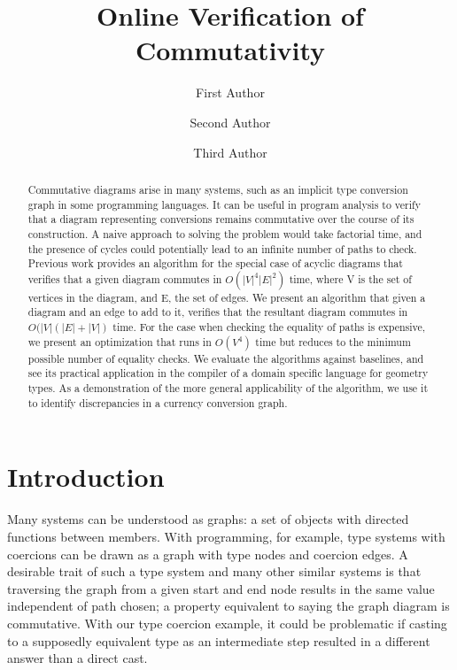 \documentclass[sigplan,review,anonymous]{acmart}
\begin{document}
\title{Online Verification of Commutativity}
%
%
\author{First Author}
\author{Second Author}
\authornotemark[1]

\author{Third Author}

\begin{abstract}
Commutative diagrams arise in many systems, such as an implicit type conversion graph in some programming languages.
It can be useful in program analysis to verify that a diagram representing conversions remains commutative over the course of its construction.
A naive approach to solving the problem would take factorial time, and the presence of cycles could potentially lead to an infinite number of paths to check. Previous work provides an algorithm for the special case of acyclic diagrams that verifies that a given diagram commutes in $O(|V|^4|E|^2)$ time, where V is the set of vertices in the diagram, and E, the set of edges. 
We present an algorithm that given a diagram and an edge to add to it, verifies that the resultant diagram commutes in $O(|V|(|E| + |V|)$ time. For the case when checking the equality of paths is expensive, we present an optimization that runs in $O(V^4)$ time but reduces to the minimum possible number of equality checks. We evaluate the algorithms against baselines, and see its practical application in the compiler of a domain specific language for geometry types. As a demonstration of the more general applicability of the algorithm, we use it to identify discrepancies in a  currency conversion graph.
\end{abstract}
%
%
%

\maketitle

\section{Introduction}
Many systems can be understood as graphs: a set of objects with directed functions between members. With programming, for example, type systems with coercions can be drawn as a graph with type nodes and coercion edges.  A desirable trait of such a type system and many other similar systems is that traversing the graph from a given start and end node results in the same value independent of path chosen; a property equivalent to saying the graph diagram is commutative.  With our type coercion example, it could be problematic if casting to a supposedly equivalent type as an intermediate step resulted in a different answer than a direct cast.
\end{document}
